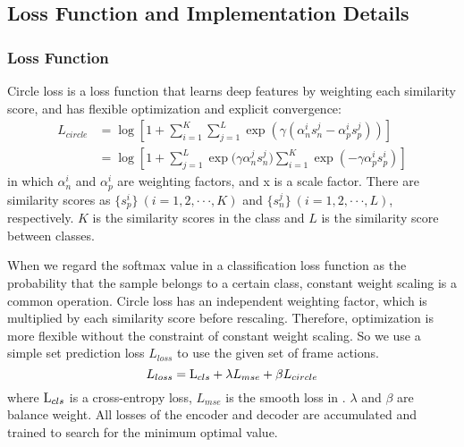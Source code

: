 \documentclass[runningheads]{llncs}
\begin{document}
\subsection{Loss Function and Implementation Details}\label{section3.4}
\subsubsection{Loss Function}
\par{
	Circle loss \cite{sun2020circle} is a loss function that learns deep features by weighting each similarity score, and has flexible optimization and explicit convergence:
}
\begin{equation}
	\begin{aligned}
		{L_{circle}} &= \log [1 + \sum\limits_{i = 1}^K {\sum\limits_{j = 1}^L {\exp (\gamma (\alpha _n^is_n^j - \alpha _p^is_p^j))} } ]\\
		&= \log [1 + \sum\limits_{j = 1}^L {\exp (\gamma \alpha _n^js_n^j} )\sum\limits_{i = 1}^K {\exp ( - \gamma \alpha _p^is_p^i)} ]
	\end{aligned}
\end{equation}
\noindent in which $\alpha _n^i$ and $\alpha _p^i$ are weighting factors, and x is a scale factor. There are similarity scores as $\{ s_p^i\} ~(i = 1,2, \cdot  \cdot  \cdot ,K)$ and $\{ s_n^j\}~ (i = 1,2, \cdot  \cdot  \cdot ,L)$, respectively. $K$ is the similarity scores in the class and $L$ is the similarity score between classes. 
\par{
	When we regard the softmax value in a classification loss function as the probability that the sample belongs to a certain class, constant weight scaling is a common operation. Circle loss has an independent weighting factor, which is multiplied by each similarity score before rescaling. Therefore, optimization is more flexible without the constraint of constant weight scaling. So we use a simple set prediction loss ${L_{loss}}$ to use the given set of frame actions.
}
\begin{equation}
	{L_{loss}} = {{\rm{L}}_{cls}} + \lambda {L_{mse}} + \beta {L_{circle}}
\end{equation}
\noindent where ${{\rm{L}}_{cls}}$ is a cross-entropy loss, ${L_{mse}}$ is the smooth loss in \cite{farha2019ms}. $\lambda $ and $\beta $ are balance weight. All losses of the encoder and decoder are accumulated and trained to search for the minimum optimal value.
\end{document}

